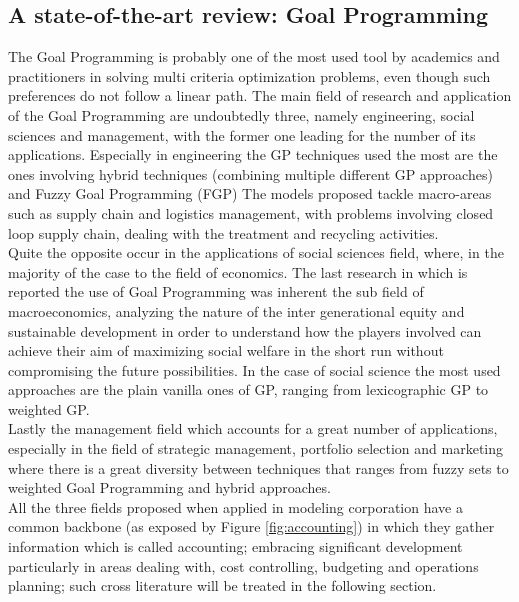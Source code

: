 \begin{doublespace}
\pagebreak 

\section{A state-of-the-art review: Goal Programming}
The Goal Programming is probably one of the most used tool by academics and practitioners in solving multi criteria optimization problems, even though such preferences do not follow a linear path\cite{Romero2014}\cite{Schniederjans1995}. The main field of research and application of the Goal Programming are undoubtedly three, namely engineering, social sciences and management\cite{Colapinto2017a}, with the former one leading for the number of its applications.
Especially in engineering the GP techniques used the most are the ones involving hybrid techniques (combining multiple different GP approaches) and Fuzzy Goal Programming (FGP) The models proposed tackle macro-areas such as supply chain and logistics management, with problems involving closed loop supply chain, dealing with the treatment and recycling activities\cite{Zarandi2011}. 
\\
Quite the opposite occur in the applications of social sciences field, where, in the majority of the case to the field of economics. The last research in which is reported the use of Goal Programming was inherent the sub field of macroeconomics, analyzing the nature of the inter generational equity and sustainable development in order to understand how the players involved can achieve their aim of maximizing social welfare in the short run without compromising the future possibilities. In the case of social science the most used approaches are the plain vanilla ones of GP, ranging from lexicographic GP to weighted GP.
\\
Lastly the management field which accounts for a great number of applications, especially in the field of strategic management, portfolio selection and marketing where there is a great diversity between techniques that ranges from fuzzy sets\cite{Trenado2014} to weighted Goal Programming and hybrid approaches.
\\
All the three fields proposed when applied in modeling corporation have a common backbone (as exposed by Figure \ref{fig:accounting})  in which they gather information which is called accounting; embracing significant development particularly in areas dealing with, cost controlling, budgeting and operations planning; such cross literature will be treated in the following section.


\end{doublespace}
